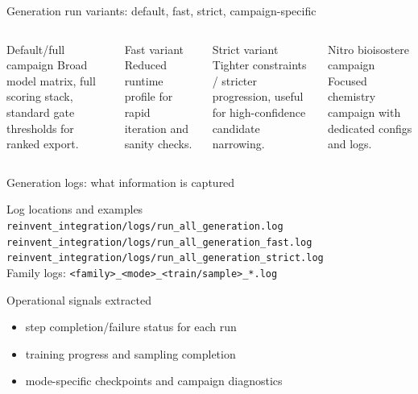 \documentclass[aspectratio=169,10pt]{beamer}
\begin{document}
\begin{frame}{Generation run variants: default, fast, strict, campaign-specific}
  \small
  \begin{columns}[T]
      \begin{block}{Default/full campaign}
        Broad model matrix, full scoring stack,
        standard gate thresholds for ranked export.
      \end{block}
      \begin{block}{Fast variant}
        Reduced runtime profile for rapid iteration and sanity checks.
      \end{block}
      \begin{block}{Strict variant}
        Tighter constraints / stricter progression,
        useful for high-confidence candidate narrowing.
      \end{block}
      \begin{block}{Nitro bioisostere campaign}
        Focused chemistry campaign with dedicated configs and logs.
      \end{block}
  \end{columns}
\end{frame}

\begin{frame}{Generation logs: what information is captured}
  \small
  \begin{block}{Log locations and examples}
    \texttt{reinvent\_integration/logs/run\_all\_generation.log}\\
    \texttt{reinvent\_integration/logs/run\_all\_generation\_fast.log}\\
    \texttt{reinvent\_integration/logs/run\_all\_generation\_strict.log}\\
    Family logs: \texttt{<family>\_<mode>\_<train/sample>\_*.log}
  \end{block}

  \begin{block}{Operational signals extracted}
    \begin{itemize}
      \item step completion/failure status for each run
      \item training progress and sampling completion
      \item mode-specific checkpoints and campaign diagnostics
    \end{itemize}
  \end{block}
\end{frame}
\end{document}
